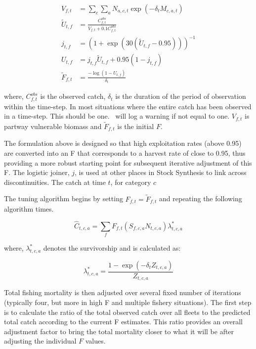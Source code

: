 \begin{align}
	V_{f,t} &= \sum\limits_c\sum\limits_a N_{a,c,t} \exp\left(-\delta_t M_{c,a,t}\right) \nonumber \\
	\tilde{U}_{t,f} &= \frac{C^{obs}_{f,t}}{V_{f,t} + 0.1 C^{obs}_{f,t}}\\
	j_{t,f} &= \left(1 + \exp \left(30 (\tilde{U}_{t,f} - 0.95) \right)\right)^{-1}\\
	U_{t,f} &= 	j_{t,f} \tilde{U}_{t,f} + 0.95 (1 - j_{t,f} )\\
	\tilde{F}_{f,t} &= \frac{-\log\left(1 - U_{t,f}\right)}{\delta_t}
\end{align}

where, \(C^{obs}_{f,t}\) is the observed catch, \(\delta_t\) is the duration of the period of observation within the time-step. In most situations where the entire catch has been observed in a time-step. This should be one. \CNAME\ will log a warning if not equal to one. \(V_{f,t}\) is partway vulnerable biomass and \(\tilde{F}_{f,t}\) is the initial \(F\).

The formulation above is designed so that high exploitation rates (above 0.95) are converted into an F that corresponds to a harvest rate of close to 0.95, thus providing a more robust starting point for subsequent iterative adjustment of this F. The logistic joiner, \(j\), is used at other places in Stock Synthesis to link across discontinuities. The catch at time \(t\), for category \(c\) 

The tuning algorithm begins by setting \(F_{f,t} = \tilde{F}_{f,t}\) and repeating the following algorithm  times.

\[
\widehat{C}_{t,c,a}  = \sum\limits_f {F}_{f,t}\left(S_{f,c,a} N_{t,c,a}\right) \lambda^*_{t,c,a}
\]

where, \(\lambda^*_{t,c,a}\) denotes the survivorship and is calculated as:

\begin{equation}\label{eq:survival}
\lambda^*_{t,c,a} = \frac{1 - \exp\left(-\delta_t Z_{t,c,a}  \right) }{Z_{t,c,a}}
\end{equation}

Total fishing mortality is then adjusted over several fixed number of iterations (typically four, but more in high F and multiple fishery situations). The first step is to calculate the ratio of the total observed catch over all fleets to the predicted total catch according to the current F estimates. This ratio provides an overall adjustment factor to bring the total mortality closer to what it will be after adjusting the individual \(F\) values.

